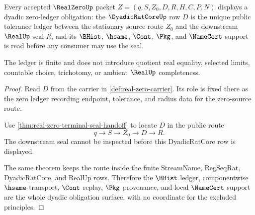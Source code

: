 \begin{theorem}
\label{thm:real-zero-dyadic-ledger-obligation}
Every accepted $\RealZeroUp$ packet $Z=(q,S,Z_0,D,R,H,C,P,N)$ displays a dyadic zero-ledger obligation: the $\DyadicRatCoreUp$ row $D$ is the unique public tolerance ledger between the stationary source route $Z_0$ and the downstream $\RealUp$ seal $R$, and its $\BHist$, $\hsame$, $\Cont$, $\Pkg$, and $\NameCert$ support is read before any consumer may use the seal.

The ledger is finite and does not introduce quotient real equality, selected limits, countable choice, trichotomy, or ambient $\RealUp$ completeness.
\end{theorem}
\begin{proof}
Read $D$ from the carrier in \autoref{def:real-zero-carrier}. Its role is fixed there as the zero ledger recording endpoint, tolerance, and radius data for the zero-source route.

Use \autoref{thm:real-zero-terminal-seal-handoff} to locate $D$ in the public route
$$
q \longrightarrow S \longrightarrow Z_0 \longrightarrow D \longrightarrow R .
$$
The downstream seal cannot be inspected before this DyadicRatCore row is displayed.

The same theorem keeps the route inside the finite StreamName, RegSeqRat, DyadicRatCore, and RealUp rows. Therefore the $\BHist$ ledger, componentwise $\hsame$ transport, $\Cont$ replay, $\Pkg$ provenance, and local $\NameCert$ support are the whole dyadic obligation surface, with no coordinate for the excluded principles.
\end{proof}

